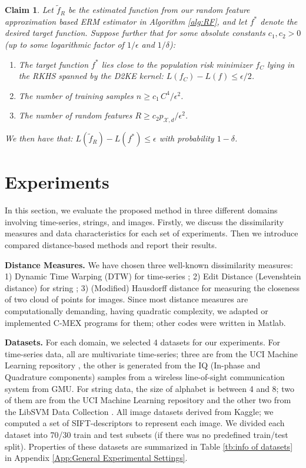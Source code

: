 \documentclass{article}
\newtheorem{claim}{Claim}
\newcommand{\X}{\mathcal{X}}
\newcommand{\1}{\mathbf{1}}
\newcommand{\tf}{\tilde{f}}
\begin{document}
\begin{claim}
Let $\tf_R$ be the estimated function from our \emph{random feature approximation} based ERM estimator in Algorithm \ref{alg:RF}, and let $f^*$ denote the desired target function. Suppose further that for some absolute constants $c_1, c_2 > 0$ (up to some logarithmic factor of $1/\epsilon$ and $1/\delta$):
\begin{enumerate}
    \item The target function $f^*$ lies close to the population risk minimizer $f_C$ lying in the RKHS spanned by the D2KE kernel: $L(f_C)-L(f) \le \epsilon/2$.
    \item The number of training samples  $n \ge c_1 \, C^4/\epsilon^2$.
    \item The number of random features $R \ge c_2 p_{\X,d}/\epsilon^2$.
\end{enumerate}
We then have that: $L(\tf_R) - L(f^*) \le \epsilon$ with probability $1-\delta$.
\end{claim}



\section{Experiments}
In this section, we evaluate the proposed method in three different domains involving time-series, strings, and images. Firstly, we discuss the dissimilarity measures and data characteristics for each set of experiments. Then we introduce compared distance-based methods and report their results.

\textbf{Distance Measures.} We have chosen three well-known dissimilarity measures: 1) Dynamic Time Warping (DTW) for time-series \cite{berndt1994using}; 2) Edit Distance (Levenshtein distance) for string \cite{navarro2001guided}; 3) (Modified) Hausdorff distance \cite{huttenlocher1993comparing, dubuisson1994modified} for measuring the closeness of two cloud of points for images. 
Since most distance measures are computationally demanding, having quadratic complexity, we adapted or implemented C-MEX programs for them; other codes were written in Matlab. 

\textbf{Datasets.} For each domain, we selected 4 datasets for our experiments. For time-series data, all are multivariate time-series; three are from the UCI Machine Learning repository \cite{frank2010uci}, the other is generated from the IQ (In-phase and Quadrature components) samples from a wireless line-of-sight communication system from GMU. For string data, the size of alphabet is between 4 and 8; two of them are from the UCI Machine Learning repository and the other two from the LibSVM Data Collection \cite{chang2011libsvm}. All image datasets derived from Kaggle; we  computed a set of SIFT-descriptors to represent each image. We divided each dataset into 70/30 train and test subsets (if there was no predefined train/test split). Properties of these datasets are summarized in Table \ref{tb:info of datasets} in Appendix \ref{App:General Experimental Settings}. 
\end{document}
